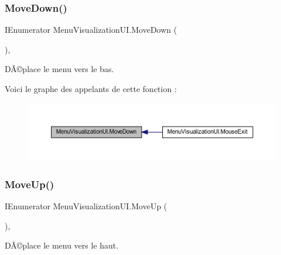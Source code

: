 \subsubsection{\texorpdfstring{Move\+Down()}{MoveDown()}}
{\footnotesize\ttfamily I\+Enumerator Menu\+Visualization\+U\+I.\+Move\+Down (\begin{DoxyParamCaption}{ }\end{DoxyParamCaption})\hspace{0.3cm}{\ttfamily [inline]}, {\ttfamily [private]}}



DÃ©place le menu vers le bas. 

Voici le graphe des appelants de cette fonction \+:
\nopagebreak
\begin{figure}[H]
\begin{center}
\leavevmode
\includegraphics[width=350pt]{class_menu_visualization_u_i_a65d11fcd4e858cf3bb0c4fdc95128030_icgraph}
\end{center}
\end{figure}
\mbox{\label{class_menu_visualization_u_i_a78a78af22e7a9248292601026c8429cb}} 
\subsubsection{\texorpdfstring{Move\+Up()}{MoveUp()}}
{\footnotesize\ttfamily I\+Enumerator Menu\+Visualization\+U\+I.\+Move\+Up (\begin{DoxyParamCaption}{ }\end{DoxyParamCaption})\hspace{0.3cm}{\ttfamily [inline]}, {\ttfamily [private]}}



DÃ©place le menu vers le haut. 

\mbox{\label{class_menu_visualization_u_i_aeb3cdd54092efba28c3a0c693dd64040}} 
